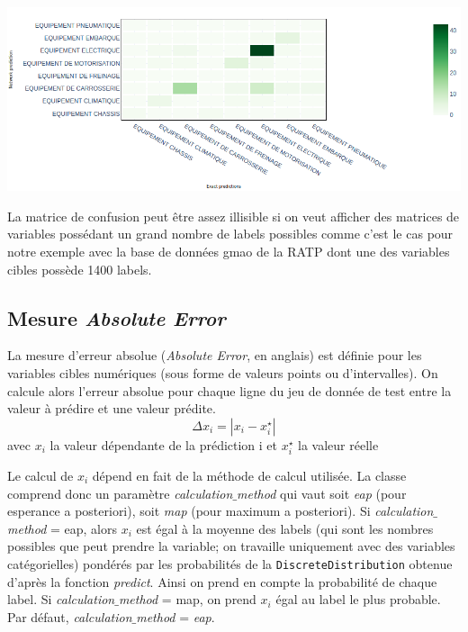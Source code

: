 \begin{center}
\includegraphics[scale=0.45]{figures/confusion_matrix.png}
\label{fig12}
\end{center}

La matrice de confusion peut être assez illisible si on veut afficher des matrices de variables possédant un grand nombre de labels possibles comme c’est le cas pour notre exemple avec la base de données gmao de la RATP dont une des variables cibles possède 1400 labels.

\subsection{Mesure \textit{Absolute Error}}

La mesure d’erreur absolue (\textit{Absolute Error}, en anglais) est définie pour les variables cibles numériques (sous forme de valeurs points ou d’intervalles). On calcule alors l’erreur absolue pour chaque ligne du jeu de donnée de test entre la valeur à prédire et une valeur prédite.
$$\Delta x_{i} = |x_{i}-x^{\star}_{i}|$$
avec $x_{i}$ la valeur dépendante de la prédiction i et $x^{\star}_{i}$ la valeur réelle

Le calcul de $x_{i}$ dépend en fait de la méthode de calcul utilisée. La classe comprend donc un paramètre \textit{calculation$\_$method} qui vaut soit \textit{eap} (pour esperance a posteriori), soit \textit{map} (pour maximum a posteriori). Si \textit{calculation$\_$method} = eap, alors $x_{i}$ est égal à la moyenne des labels (qui sont les nombres possibles que peut prendre la variable; on travaille uniquement avec des variables catégorielles) pondérés par les probabilités de la \texttt{DiscreteDistribution} obtenue d’après la fonction \textit{predict}. Ainsi on prend en compte la probabilité de chaque label. Si \textit{calculation$\_$method} = map, on prend $x_{i}$ égal au label le plus probable. Par défaut, \textit{calculation$\_$method} = \textit{eap}.

